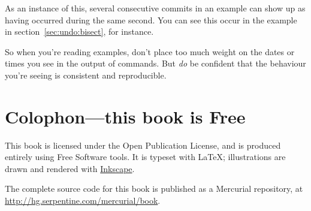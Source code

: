 As an instance of this, several consecutive commits in an example can
show up as having occurred during the same second.  You can see this
occur in the  example in section~\ref{sec:undo:bisect},
for instance.

So when you're reading examples, don't place too much weight on the
dates or times you see in the output of commands.  But \emph{do} be
confident that the behaviour you're seeing is consistent and
reproducible.

\section{Colophon---this book is Free}

This book is licensed under the Open Publication License, and is
produced entirely using Free Software tools.  It is typeset with
\LaTeX{}; illustrations are drawn and rendered with
\href{http://www.inkscape.org/}{Inkscape}.

The complete source code for this book is published as a Mercurial
repository, at \url{http://hg.serpentine.com/mercurial/book}.

